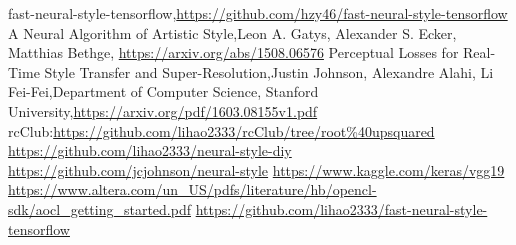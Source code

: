 \begin{thebibliography}{9}

  fast-neural-style-tensorflow,\url{https://github.com/hzy46/fast-neural-style-tensorflow}
  A Neural Algorithm of Artistic Style,Leon A. Gatys, Alexander S. Ecker, Matthias Bethge, \url{https://arxiv.org/abs/1508.06576}
  Perceptual Losses for Real-Time Style Transfer and Super-Resolution,Justin Johnson, Alexandre Alahi, Li Fei-Fei,Department of Computer Science, Stanford University,\url{https://arxiv.org/pdf/1603.08155v1.pdf}
  rcClub:\url{https://github.com/lihao2333/rcClub/tree/root\%40upsquared}
\url{https://github.com/lihao2333/neural-style-diy}
\url{https://github.com/jcjohnson/neural-style}
\url{https://www.kaggle.com/keras/vgg19}
\url{https://www.altera.com/un\_US/pdfs/literature/hb/opencl-sdk/aocl\_getting\_started.pdf}
  \url{https://github.com/lihao2333/fast-neural-style-tensorflow}
\end{thebibliography}
 
\clearpage
